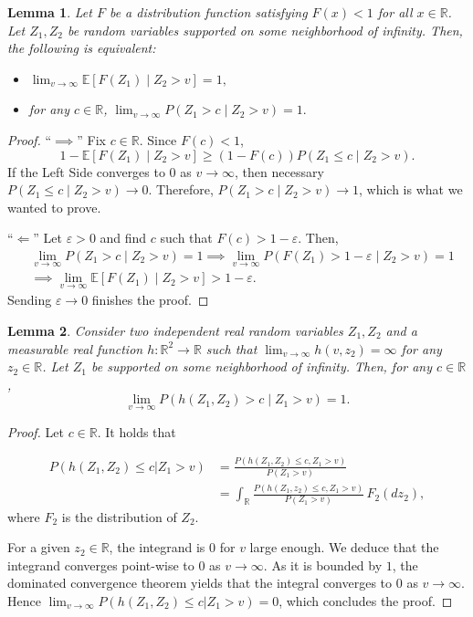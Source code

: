\documentclass[a4paper,11pt]{article}
\newtheorem{lemma}{Lemma}
\begin{document}
\begin{lemma}\label{Observation}
Let $F$ be a distribution function satisfying $F(x)<1$ for all $x\in\mathbb{R}$.  Let $Z_1, Z_2$ be random variables supported on some neighborhood of infinity. Then, the following is equivalent:
\begin{itemize}
    \item    $
        \lim_{v\to\infty} \mathbb{E}[ F(Z_1)\mid Z_2>v] = 1,
   $
    \item for any $c\in\mathbb{R}$, $ \lim_{v\to\infty}P(Z_1> c\mid Z_2>v) = 1.$
\end{itemize}
\end{lemma}
\begin{proof}
``$\implies$''  Fix \(c\in\mathbb R\). Since \(F(c)<1\),
\[
1-\mathbb E[F(Z_1)\mid Z_2>v]
\ge
(1-F(c))P(Z_1\le c\mid Z_2>v).
\]
If the Left Side converges to 0 as $v\to\infty$, then necessary
\(P(Z_1\le c\mid Z_2>v)\to0\). Therefore, 
\(P(Z_1>c\mid Z_2>v)\to1\), which is what we wanted to prove. 

``$\Longleftarrow$'' Let  $\varepsilon>0$ and find $c$  such that $F(c)>1-\varepsilon$.  Then, 
\begin{align*}
   & \lim_{v\to\infty}P(Z_1> c\mid Z_2>v) = 1 \implies 
   \lim_{v\to\infty}P(F(Z_1)> 1-\varepsilon\mid Z_2>v) = 1\\&\implies \lim_{v\to\infty}\mathbb{E}[F(Z_1)\mid Z_2>v] >1-\varepsilon. 
\end{align*}
Sending $\varepsilon\to 0 $ finishes the proof. 
\end{proof}




\begin{lemma}\label{LemmaAboutInfinity}
Consider two independent real random variables $Z_1, Z_2$ and a measurable real function $h:\mathbb{R}^2\to\mathbb{R}$ such that $\lim_{v\to\infty}h(v, z_2) = \infty$ for any $z_2\in\mathbb{R}$. Let $Z_1$ be supported on some neighborhood of infinity. Then, for any $c\in\mathbb{R}$, 
$$
\lim_{v\to\infty} P(h(Z_1, Z_2)> c\mid Z_1>v)=1.
$$
\end{lemma}

\begin{proof}
Let $c\in\mathbb R$. It holds that

\begin{align*}
 P(h(Z_1,Z_2)\leq c\vert Z_1>v)&=\frac{ P(h(Z_1,Z_2)\leq c,Z_1>v)}{ P(Z_1>v)}\\
&=\int_{\mathbb{R}}\frac{ P(h(Z_1,z_2)\leq c,Z_1>v)}{ P(Z_1>v)}\,F_{2}(dz_2),
\end{align*}
where $F_2$ is the distribution of $Z_2$.


For a given $z_2\in\mathbb{R}$, the integrand is $0$ for $v$ large enough. We deduce that the integrand converges point-wise to $0$ as $v\to \infty$. As it is bounded by $1$, the dominated convergence theorem yields that the integral converges to $0$ as $v\to\infty$. Hence $\lim_{v\to\infty} P(h(Z_1,Z_2)\leq c\vert Z_1>v) = 0$, which concludes the proof. 
\end{proof}
\end{document}
